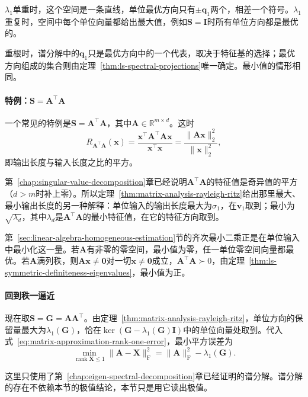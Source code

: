 $\lambda_1$单重时，这个空间是一条直线，单位最优方向只有$\pm\bm q_1$两个，相差一个符号。$\lambda_1$重复时，空间中每个单位向量都给出最大值，例如$\bm S=\bm I$时所有单位方向都是最优的。

重根时，谱分解中的$\bm q_1$只是最优方向中的一个代表，取决于特征基的选择；最优方向组成的集合则由定理~\ref{thm:ls-spectral-projections}唯一确定。最小值的情形相同。

\paragraph{特例：$\bm S=\bm A^\top\bm A$}
一个常见的特例是$\bm S=\bm A^\top\bm A$，其中$\bm A\in\mathbb R^{m\times d}$。这时
\[
 R_{\bm A^\top\bm A}(\bm x)=\frac{\bm x^\top\bm A^\top\bm A\bm x}{\bm x^\top\bm x}=\frac{\lVert\bm A\bm x\rVert_2^2}{\lVert\bm x\rVert_2^2},
\]
即输出长度与输入长度之比的平方。

第~\ref{chap:singular-value-decomposition}章已经说明$\bm A^\top\bm A$的特征值是奇异值的平方（$d>m$时补上零）。所以定理~\ref{thm:matrix-analysis-rayleigh-ritz}给出那里最大、最小输出长度的另一种解释：单位输入的输出长度最大为$\sigma_1$，在$\bm v_1$取到；最小为$\sqrt{\lambda_d}$，其中$\lambda_d$是$\bm A^\top\bm A$的最小特征值，在它的特征方向取到。

第~\ref{sec:linear-algebra-homogeneous-estimation}节的齐次最小二乘正是在单位输入中最小化这一量。若$\bm A$有非零的零空间，最小值为零，任一单位零空间向量都最优。若$\bm A$满列秩，则$\bm A\bm x\neq\bm0$对一切$\bm x\neq\bm0$成立，$\bm A^\top\bm A\succ0$，由定理~\ref{thm:ls-symmetric-definiteness-eigenvalues}，最小值为正。

\paragraph{回到秩一逼近}
现在取$\bm S=\bm G=\bm A\bm A^\top$。由定理~\ref{thm:matrix-analysis-rayleigh-ritz}，单位方向的保留量最大为$\lambda_1(\bm G)$，恰在$\ker(\bm G-\lambda_1(\bm G)\bm I)$中的单位向量处取到。代入式~\eqref{eq:matrix-approximation-rank-one-error}，最小平方误差为
\begin{equation}
 \min_{\operatorname{rank}\bm X\leq1}\lVert\bm A-\bm X\rVert_{\mathrm F}^2=\lVert\bm A\rVert_{\mathrm F}^2-\lambda_1(\bm G) .
 \label{eq:matrix-approximation-rank-one-min-error-gram}
\end{equation}

这里只使用了第~\ref{chap:eigen-spectral-decomposition}章已经证明的谱分解。谱分解的存在不依赖本节的极值结论，本节只是用它读出极值。

